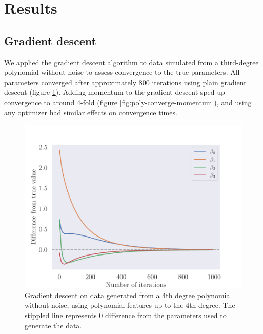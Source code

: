 \section{Results}\label{sec:results}

\subsection{Gradient descent}

We applied the gradient descent algorithm to data simulated from a third-degree polynomial without noise to assess convergence to the true parameters. All parameters converged after approximately 800 iterations using plain gradient descent (figure \ref{fig:poly-converge}). Adding momentum to the gradient descent sped up convergence to around 4-fold (figure \ref{fig:poly-converge-momentum}), and using any optimizer had similar effects on convergence times.

\begin{figure}
    \centering
    \includegraphics[width=0.99\linewidth]{examples/tests_even/figs/gradient-descent-polynomial-convergence.pdf}
    \caption{Gradient descent on data generated from a 4th degree polynomial without noise, using polynomial features up to the 4th degree. The stippled line represents 0 difference from the parameters used to generate the data.}
    \label{fig:poly-converge}
\end{figure}

